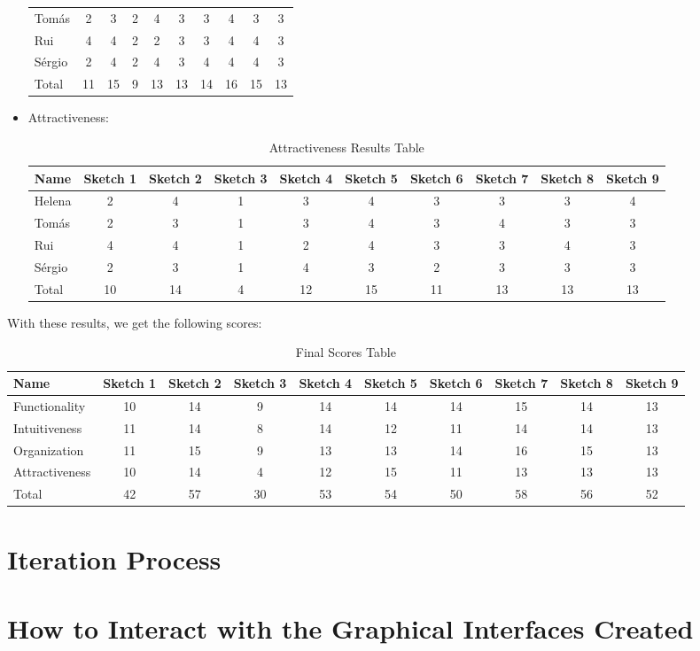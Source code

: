 \begin{itemize}
\begin{table}[H]
\begin{tabular}{l*{9}{c}}
        Tomás & 2 & 3 & 2 & 4 & 3 & 3 & 4 & 3 & 3 \\ 
        Rui & 4 & 4 & 2 & 2 & 3 & 3 & 4 & 4 & 3 \\ 
        Sérgio & 2 & 4 & 2 & 4 & 3 & 4 & 4 & 4 & 3 \\ 
        Total & 11 & 15 & 9 & 13 & 13 & 14 & 16 & 15 & 13 \\
    \end{tabular}
\end{table}
\item Attractiveness: 
\begin{table}[H]
    \caption{Attractiveness Results Table}
    \begin{tabular}{l*{9}{c}}
        Name & Sketch 1 & Sketch 2 & Sketch 3 & Sketch 4 
        & Sketch 5 & Sketch 6 & Sketch 7 & Sketch 8 & Sketch 9 \\
        \hline 
        Helena & 2 & 4 & 1 & 3 & 4 & 3 & 3 & 3 & 4 \\
        Tomás & 2 & 3 & 1 & 3 & 4 & 3 & 4 & 3 & 3 \\ 
        Rui & 4 & 4 & 1 & 2 & 4 & 3 & 3 & 4 & 3 \\ 
        Sérgio & 2 & 3 & 1 & 4 & 3 & 2 & 3 & 3 & 3 \\ 
        Total & 10 & 14 & 4 & 12 & 15 & 11 & 13 & 13 & 13 \\
    \end{tabular}
\end{table}
\end{itemize}
With these results, we get the following scores: 
\begin{table}[H]
    \caption{Final Scores Table}
    \begin{tabular}{l*{9}{c}}
        Name & Sketch 1 & Sketch 2 & Sketch 3 & Sketch 4 
        & Sketch 5 & Sketch 6 & Sketch 7 & Sketch 8 & Sketch 9 \\
        \hline 
        Functionality & 10 & 14 & 9 & 14 & 14 & 14 & 15 & 14 & 13 \\
        Intuitiveness & 11 & 14 & 8 & 14 & 12 & 11 & 14 & 14 & 13 \\ 
        Organization & 11 & 15 & 9 & 13 & 13 & 14 & 16 & 15 & 13 \\ 
        Attractiveness & 10 & 14 & 4 & 12 & 15 & 11 & 13 & 13 & 13 \\ 
        Total & 42 & 57 & 30 & 53 & 54 & 50 & 58 & 56 & 52 \\
    \end{tabular}
\end{table}
\section{Iteration Process}
\section{How to Interact with the Graphical Interfaces Created}
